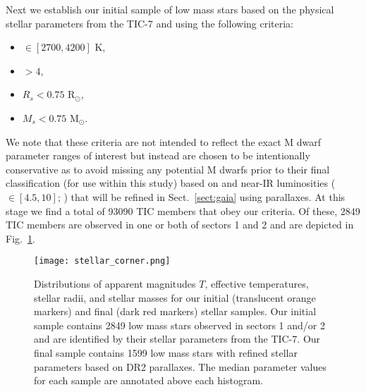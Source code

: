 Next we establish our initial sample of low mass stars based on the physical stellar parameters from the
TIC-7 and using the following criteria:

\begin{itemize}
\item \teff{} $\in [2700,4200]$ K,
\item \logg{} $>4$,
\item $R_s < 0.75$ R$_{\odot}$,
\item $M_s < 0.75$ M$_{\odot}$.
\end{itemize}

\noindent We note that these criteria are not intended to reflect the exact M dwarf parameter ranges of
interest but instead are chosen to be intentionally conservative as to avoid missing any potential
M dwarfs prior to their final classification (for use within this study) based on \teff{} and 
near-IR luminosities  (\MK{} $\in [4.5,10]$; \citealt{delfosse00, benedict16}) that will be refined
in Sect.~\ref{sect:gaia} using \gaia{} parallaxes.
At this stage we find a total of 93090 TIC members that obey our criteria. Of these, 2849 TIC members
are observed in one or both of \tess{} sectors 1 and 2 and are depicted in Fig.~\ref{fig:stars}.

\begin{figure}
  \centering
  \texttt{[image: stellar\_corner.png]}
  \caption{Distributions of \tess{} apparent magnitudes $T$, effective temperatures,
    stellar radii, and stellar masses for our initial (translucent orange markers) and final
    (dark red markers) stellar samples. Our initial sample contains 2849 low mass stars observed in
    sectors 1 and/or 2 and are identified by their stellar parameters from the TIC-7. Our final sample contains
    1599 low mass stars with refined stellar parameters based on \gaia{}
    DR2 parallaxes. The median parameter values for each sample are annotated above each histogram.}
  \label{fig:stars}
\end{figure}
  

